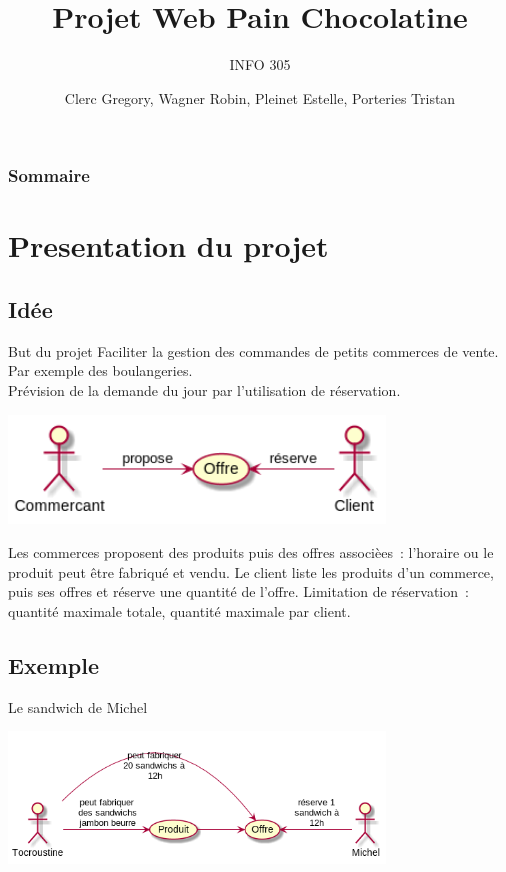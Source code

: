 \documentclass{beamer}
\title{Projet Web Pain Chocolatine}
\subtitle{INFO 305}
\author{Clerc Gregory, Wagner Robin, Pleinet Estelle, Porteries Tristan}
\begin{document}
\begin{frame}
  \titlepage
\end{frame}

\begin{frame}
    \frametitle{Sommaire}
    \begin{multicols}{2}
      {
        \tableofcontents
      }
    \end{multicols}
\end{frame}

\section{Presentation du projet}

\subsection{Idée}

\begin{frame}{But du projet}
	Faciliter la gestion des commandes de petits commerces de vente. Par exemple des boulangeries.\\
	Prévision de la demande du jour par l'utilisation de réservation.
	\begin{center}
		\includegraphics[width=10cm]{site_use.png}
	\end{center}
\end{frame}

\begin{frame}
	Les commerces proposent des produits puis des offres associèes~: l'horaire ou le produit peut être fabriqué et vendu.
	Le client liste les produits d'un commerce, puis ses offres et réserve une quantité de l'offre.
	\bigbreak
	Limitation de réservation~: quantité maximale totale, quantité maximale par client.
\end{frame}


\subsection{Exemple}

\begin{frame}{Le sandwich de Michel}
	\begin{center}
		\includegraphics[width=10cm]{site_exemple.png}
	\end{center}
\end{frame}
\end{document}
